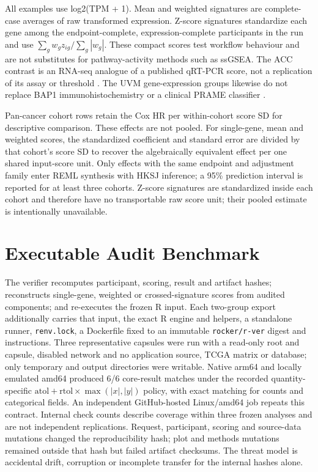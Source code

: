 \documentclass[12pt]{article}
\begin{document}
All examples use log2(TPM + 1). Mean and weighted signatures are complete-case
averages of raw transformed expression. Z-score signatures standardize each
gene among the endpoint-complete, expression-complete participants in the run
and use \(\sum_g w_g z_{ig}/\sum_g |w_g|\). These compact scores test
workflow behaviour and are not substitutes for pathway-activity methods such as
ssGSEA. The ACC contrast is an RNA-seq analogue of a published qRT-PCR score,
not a replication of its assay or threshold \citep{fragoso2012bub1b}. The UVM
gene-expression groups likewise do not replace BAP1 immunohistochemistry or a clinical PRAME
classifier \citep{han2023bap1prame}.

Pan-cancer cohort rows retain the Cox HR per within-cohort score SD for
descriptive comparison. These effects are not pooled. For single-gene, mean
and weighted scores, the standardized coefficient and standard error are
divided by that cohort's score SD to recover the algebraically equivalent
effect per one shared input-score unit. Only effects with the same endpoint and
adjustment family enter REML synthesis with HKSJ inference; a 95\% prediction
interval is reported for at least three cohorts. Z-score signatures are
standardized inside each cohort and therefore have no transportable raw score
unit; their pooled estimate is intentionally unavailable.



\section*{Executable Audit Benchmark}

The verifier recomputes participant, scoring, result and artifact hashes;
reconstructs single-gene, weighted or crossed-signature scores from audited
components; and re-executes the frozen R input. Each two-group export additionally carries
that input, the exact R engine and helpers, a standalone runner,
\texttt{renv.lock}, a Dockerfile fixed to an immutable
\texttt{rocker/r-ver} digest and instructions. Three representative capsules
were run with a read-only root and capsule, disabled network and no application
source, TCGA matrix or database; only temporary and output directories were
writable. Native arm64 and locally emulated amd64 produced 6/6 core-result
matches under the recorded quantity-specific
\(\mathrm{atol}+\mathrm{rtol}\times\max(|x|,|y|)\) policy, with exact matching
for counts and categorical fields. An independent GitHub-hosted Linux/amd64 job
repeats this contract. Internal check counts describe coverage within three
frozen analyses and are not independent replications. Request, participant,
scoring and source-data mutations changed the reproducibility hash; plot and
methods mutations remained
outside that hash but failed artifact checksums. The threat model is accidental
drift, corruption or incomplete transfer for the internal hashes alone.
\end{document}
